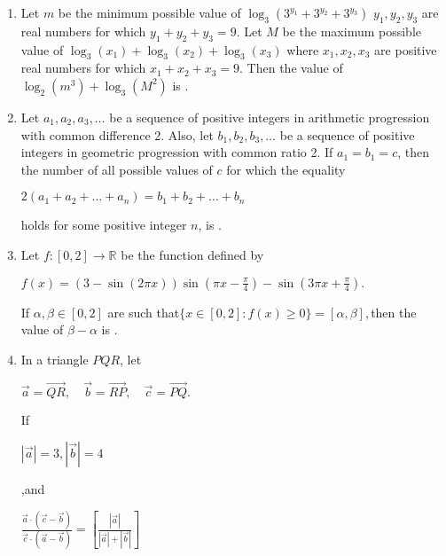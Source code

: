 \documentclass{article}
\begin{document}
\begin{enumerate}
\item  Let $m$ be the minimum possible value of $\log_3(3^{y_1} + 3^{y_2} + 3^{y_3})$ $y_1, y_2, y_3$ are real numbers for which $y_1 + y_2 + y_3 = 9$. Let $M$ be the maximum possible value of $\log_3(x_1) + \log_3(x_2) + \log_3(x_3)$ where $x_1, x_2, x_3$ are positive real numbers for which $x_1 + x_2 + x_3 = 9$. Then the value of $\log_2(m^3) + \log_3(M^2)$ is \underline{\hspace{2cm}}.

\item  Let $a_1, a_2, a_3, \dots $ be a sequence of positive integers in arithmetic progression with common difference 2. Also, let $b_1, b_2, b_3, \dots $ be a sequence of positive integers in geometric progression with common ratio 2. If $a_1 = b_1 = c$, then the number of all possible values of $c$ for which the equality 

\begin{center}
    $ 2(a_1 + a_2 + \dots + a_n) = b_1 + b_2 + \dots + b_n $
\end{center}

    holds for some positive integer $n$, is \underline{\hspace{2cm}}.

\item  Let $f: [0,2] \to \mathbb{R}$ be the function defined by

\begin{center}
    $f(x) = (3 - \sin(2\pi x)) \sin\left(\pi x - \frac{\pi}{4}\right) - \sin(3\pi x + \frac{\pi}{4}).$
\end{center}
If $\alpha, \beta \in [0,2]$ are such that$\{ x \in [0,2] : f(x) \geq 0 \} = [\alpha, \beta],$then the value of $\beta - \alpha$ is \underline{\hspace{2cm}}.

\item  In a triangle $PQR$, let 

   
\begin{center}$\vec{a} = \overrightarrow{QR}, \quad \vec{b} = \overrightarrow{RP}, \quad \vec{c} = \overrightarrow{PQ}.$\end{center}

If 
    
    \begin{center}$|\vec{a}| = 3,  |\vec{b}| = 4$\end{center},and \begin{center}$\frac{\vec{a} \cdot (\vec{c} - \vec{b})}{\vec{c}\cdot(\vec{a} - \vec{b})}=[\frac{|\vec{a}|}{|\vec{a}| + |\vec{b}|}]$\end{center}


\end{enumerate}
\end{document}
